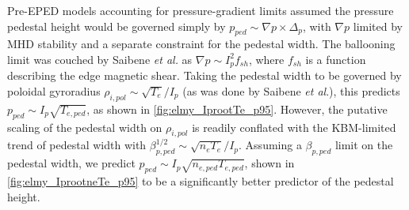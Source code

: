 \begin{figure}[t]
 \pushtooutside
 \begin{floatrow}
 \end{floatrow}
\end{figure}

Pre-EPED models accounting for pressure-gradient limits assumed the pressure pedestal height would be governed simply by $p_{ped} \sim \nabla p \times \Delta_p$, with $\nabla p$ limited by MHD stability and a separate constraint for the pedestal width.  The ballooning limit was couched by Saibene \emph{et al.} \cite{Saibene1999} as $\nabla p \sim I_p^2 f_{sh}$, where $f_{sh}$ is a function describing the edge magnetic shear.  Taking the pedestal width to be governed by poloidal gyroradius $\rho_{i,pol} \sim \sqrt{T_e}/I_p$ (as was done by Saibene \emph{et al}.), this predicts $p_{ped} \sim I_p \sqrt{T_{e,ped}}$, as shown in \cref{fig:elmy_IprootTe_p95}.  However, the putative scaling of the pedestal width on $\rho_{i,pol}$ is readily conflated with the KBM-limited trend of pedestal width with $\beta_{p,ped}^{1/2} \sim \sqrt{n_e T_e}/I_p$.  Assuming a $\beta_{p,ped}$ limit on the pedestal width, we predict $p_{ped} \sim I_p \sqrt{n_{e,ped} T_{e,ped}}$, shown in \cref{fig:elmy_IprootneTe_p95} to be a significantly better predictor of the pedestal height.

